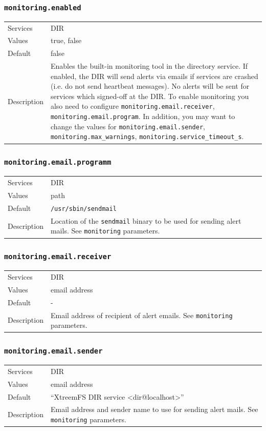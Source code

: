 \documentclass[a4paper,10pt]{book}
\begin{document}
\subsubsection{\texttt{monitoring.enabled}}
\begin{tabular}{lp{10cm}}
 Services & DIR\\
 Values   & true, false \\
 Default  & false\\
 Description & Enables the built-in monitoring tool in the directory service. If enabled, the DIR will send alerts via emails if services are crashed (i.e. do not send heartbeat messages). No alerts will be sent for services which signed-off at the DIR. To enable monitoring you also need to configure \texttt{monitoring.email.receiver}, \texttt{monitoring.email.program}. In addition, you may want to change the values for \texttt{monitoring.email.sender}, \texttt{monitoring.max\_warnings}, \texttt{monitoring.service\_timeout\_s}.
\end{tabular}

\subsubsection{\texttt{monitoring.email.programm}}
\begin{tabular}{lp{10cm}}
 Services & DIR\\
 Values   & path \\
 Default  & \texttt{/usr/sbin/sendmail} \\
 Description & Location of the \texttt{sendmail} binary to be used for sending alert mails. See \texttt{monitoring} parameters.
\end{tabular}

\subsubsection{\texttt{monitoring.email.receiver}}
\begin{tabular}{lp{10cm}}
 Services & DIR\\
 Values   & email address \\
 Default  & - \\
 Description & Email address of recipient of alert emails. See \texttt{monitoring} parameters.
\end{tabular}

\subsubsection{\texttt{monitoring.email.sender}}
\begin{tabular}{lp{10cm}}
 Services & DIR\\
 Values   & email address \\
 Default  & ``XtreemFS DIR service <dir@localhost>''\\
 Description & Email address and sender name to use for sending alert mails. See \texttt{monitoring} parameters.
\end{tabular}
\end{document}
